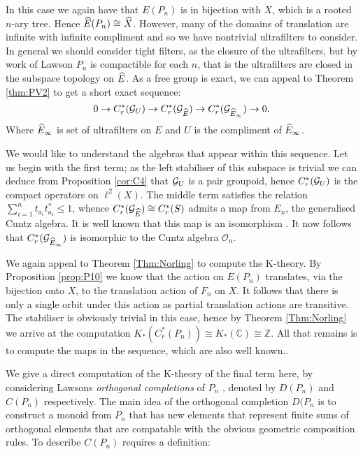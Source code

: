 \begin{example}
\begin{example}
In this case we again have that $E(P_{n})$ is in bijection with $X$, which is a rooted $n$-ary tree. Hence $\widehat{E}(P_{n}) \cong \widehat{X}$. However, many of the domains of translation are infinite with infinite compliment and so we have nontrivial ultrafilters to consider. In general we should consider tight filters, as the closure of the ultrafilters, but by work of Lawson \cite{lawson-2011-1} $P_{n}$ is compactible for each $n$, that is the ultrafilters are closed in the subspace topology on $\widehat{E}$. As a free group is exact, we can appeal to Theorem \ref{thm:PV2} to get a short exact sequence:
\begin{equation*}
0 \rightarrow C^{*}_{r}(\mathcal{G}_{U}) \rightarrow C^{*}_{r}(\mathcal{G}_{\widehat{E}}) \rightarrow C^{*}_{r}(\mathcal{G}_{\widehat{E}_{\infty}}) \rightarrow 0.
\end{equation*}
Where $\widehat{E}_{\infty}$ is set of ultrafilters on $E$ and $U$ is the compliment of $\widehat{E}_{\infty}$.

We would like to understand the algebras that appear within this sequence. Let us begin with the first term; as the left stabiliser of this subspace is trivial we can deduce from Proposition \ref{cor:C4} that $\mathcal{G}_{U}$ is a pair groupoid, hence $C^{*}_{r}(\mathcal{G}_{U})$ is the compact operators on $\ell^{2}(X)$. The middle term satisfies the relation $\sum_{i=1}^{n}t_{a_{i}}t_{a_{i}}^{*} \leq 1$, whence $C^{*}_{r}(\mathcal{G}_{\widehat{E}}) \cong C^{*}_{r}(S)$ admits a map from $E_{n}$, the generalised Cuntz algebra. It is well known that this map is an isomorphism \cite{MR1724106,MR584266}. It now follows that $C^{*}_{r}(\mathcal{G}_{\widehat{E}_{\infty}})$ is isomorphic to the Cuntz algebra $\mathcal{O}_{n}$.

We again appeal to Theorem \ref{Thm:Norling} to compute the K-theory. By Proposition \ref{prop:P10} we know that the action on $E(P_{n})$ translates, via the bijection onto $X$, to the translation action of $F_{n}$ on $X$. It follows that there is only a single orbit under this action as partial translation actions are transitive. The stabiliser is obviously trivial in this case, hence by Theorem \ref{Thm:Norling} we arrive at the computation $K_{*}(C^{*}_{r}(P_{n})) \cong K_{*}(\mathbb{C})\cong \mathbb{Z}$. All that remains is to compute the maps in the sequence, which are also well known..

We give a direct computation of the K-theory of the final term here, by considering Lawsons \textit{orthogonal completions} of $P_{n}$ \cite{lawson-2011-1}, denoted by $D(P_{n})$ and $C(P_{n})$ respectively. The main idea of the orthogonal completion $D(P_{n}$ is to construct a monoid from $P_{n}$ that has new elements that represent finite sums of orthogonal elements that are compatable with the obvious geometric composition rules. To describe $C(P_{n})$ requires a definition:


\end{example}
\end{example}
